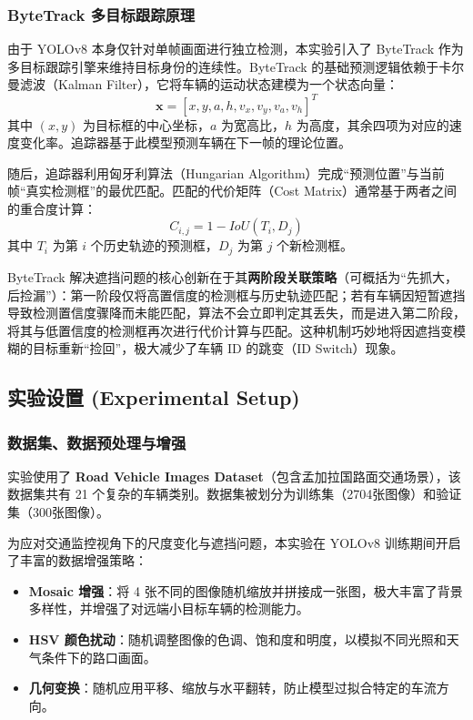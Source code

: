\documentclass{article}
\begin{document}
\subsubsection{ByteTrack 多目标跟踪原理}
由于 YOLOv8 本身仅针对单帧画面进行独立检测，本实验引入了 ByteTrack 作为多目标跟踪引擎来维持目标身份的连续性。ByteTrack 的基础预测逻辑依赖于卡尔曼滤波（Kalman Filter），它将车辆的运动状态建模为一个状态向量：
$$ \mathbf{x} = [x, y, a, h, v_x, v_y, v_a, v_h]^T $$
其中 $(x, y)$ 为目标框的中心坐标，$a$ 为宽高比，$h$ 为高度，其余四项为对应的速度变化率。追踪器基于此模型预测车辆在下一帧的理论位置。

随后，追踪器利用匈牙利算法（Hungarian Algorithm）完成“预测位置”与当前帧“真实检测框”的最优匹配。匹配的代价矩阵（Cost Matrix）通常基于两者之间的重合度计算：
$$ C_{i,j} = 1 - IoU(T_i, D_j) $$
其中 $T_i$ 为第 $i$ 个历史轨迹的预测框，$D_j$ 为第 $j$ 个新检测框。

ByteTrack 解决遮挡问题的核心创新在于其\textbf{两阶段关联策略}（可概括为“先抓大，后捡漏”）：第一阶段仅将高置信度的检测框与历史轨迹匹配；若有车辆因短暂遮挡导致检测置信度骤降而未能匹配，算法不会立即判定其丢失，而是进入第二阶段，将其与低置信度的检测框再次进行代价计算与匹配。这种机制巧妙地将因遮挡变模糊的目标重新“捡回”，极大减少了车辆 ID 的跳变（ID Switch）现象。

\subsection{实验设置 (Experimental Setup)}

\subsubsection{数据集、数据预处理与增强}
实验使用了 \textbf{Road Vehicle Images Dataset}（包含孟加拉国路面交通场景），该数据集共有 21 个复杂的车辆类别。数据集被划分为训练集（2704张图像）和验证集（300张图像）。

为应对交通监控视角下的尺度变化与遮挡问题，本实验在 YOLOv8 训练期间开启了丰富的数据增强策略：
\begin{itemize}
    \item \textbf{Mosaic 增强}：将 4 张不同的图像随机缩放并拼接成一张图，极大丰富了背景多样性，并增强了对远端小目标车辆的检测能力。
    \item \textbf{HSV 颜色扰动}：随机调整图像的色调、饱和度和明度，以模拟不同光照和天气条件下的路口画面。
    \item \textbf{几何变换}：随机应用平移、缩放与水平翻转，防止模型过拟合特定的车流方向。
\end{itemize}
\end{document}
